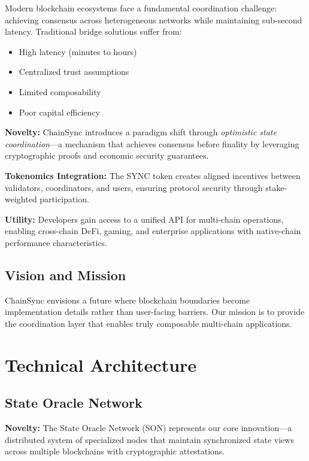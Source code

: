 \documentclass[12pt,a4paper]{article}
\begin{document}
Modern blockchain ecosystems face a fundamental coordination challenge: achieving consensus across heterogeneous networks while maintaining sub-second latency. Traditional bridge solutions suffer from:

\begin{itemize}
    \item High latency (minutes to hours)
    \item Centralized trust assumptions
    \item Limited composability
    \item Poor capital efficiency
\end{itemize}

\textbf{Novelty:} ChainSync introduces a paradigm shift through \textit{optimistic state coordination}---a mechanism that achieves consensus before finality by leveraging cryptographic proofs and economic security guarantees.

\textbf{Tokenomics Integration:} The SYNC token creates aligned incentives between validators, coordinators, and users, ensuring protocol security through stake-weighted participation.

\textbf{Utility:} Developers gain access to a unified API for multi-chain operations, enabling cross-chain DeFi, gaming, and enterprise applications with native-chain performance characteristics.

\subsection{Vision and Mission}

ChainSync envisions a future where blockchain boundaries become implementation details rather than user-facing barriers. Our mission is to provide the coordination layer that enables truly composable multi-chain applications.

\section{Technical Architecture}

\subsection{State Oracle Network}

\textbf{Novelty:} The State Oracle Network (SON) represents our core innovation---a distributed system of specialized nodes that maintain synchronized state views across multiple blockchains with cryptographic attestations.
\end{document}
